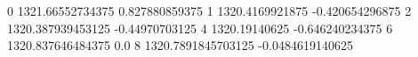 0 1321.66552734375 0.827880859375
1 1320.4169921875 -0.420654296875
2 1320.387939453125 -0.44970703125
4 1320.19140625 -0.646240234375
6 1320.837646484375 0.0
8 1320.7891845703125 -0.0484619140625
